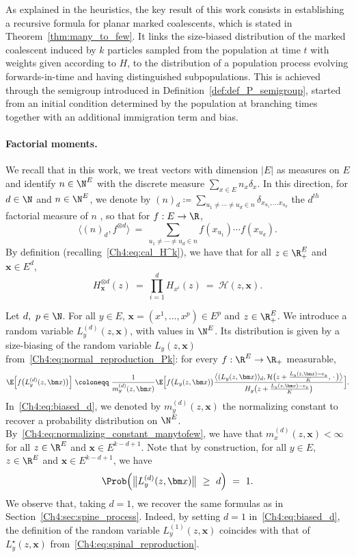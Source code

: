 \begin{refsegment}
As explained in the heuristics, the key result of this work consists in establishing a recursive formula for planar marked coalescents, which is stated in Theorem~\ref{thm:many_to_few}. It links the size-biased distribution of the marked coalescent induced by $k$ particles sampled from the population at time $t$ with weights given according to $H$, to the distribution of a population process evolving forwards-in-time and having distinguished subpopulations. 
This is achieved through the semigroup introduced in Definition~\ref{def:def_P_semigroup}, started from an initial condition determined by the population at branching times together with an additional immigration term and bias.
\paragraph{Factorial moments.}

We recall that in this work, we treat vectors  with dimension $|E|$ as measures on $E$ and identify $n\in \N^E$ with the discrete measure $\sum_{x\in E} n_x \delta_x$. In this direction, for $d\in \N$ and $n\in\N^E$, we denote by $(n)_d \coloneqq \sum_{u_1\neq \cdots \neq u_d \in n} \delta_{x_{u_1},\ldots x_{u_d}}$ the $d^{th}$ factorial measure of $n$ \cite[see][Chapter~1]{daley_vere-jones}, so that for $f:E\to\R$,
\[
\big\langle (n)_d,f^{\otimes d}\big\rangle \ =\ \sum_{u_1\neq \cdots \neq u_d \in n} f(x_{u_1})\cdots f(x_{u_d}).
\]
By definition (recalling~\eqref{Ch4:eq:cal_H^k}), we have that for all $z\in \R_+^E$ and $\bm x\in E^d$, 
\[
H_{\bm x}^{\otimes d}(z)\ =\ \prod_{i=1}^d H_{x^i}(z)\ =\ \mathcal{H}(z, \bm x).
\]


Let $d,\ p \in\N$. 
For all $y\in E$, $\bm x=(x^1, \ldots, x^{p})\in E^{p}$ and $z \in \R_+^E$. We introduce a random variable $L^{(d)}_{y}(z,\bm x)$, with values in $\N^E$. Its distribution is given by a size-biasing of the random variable $L_{y}(z,\bm x)$ from~\eqref{Ch4:eq:normal_reproduction_Pk}: for every $f:\R^E\to \R_+$ measurable,
\begin{equation}\label{Ch4:eq:biased_d}
\E\Big[f\big(L^{(d)}_{y}(z,\bm x)\big)\Big]\ \coloneqq\ \frac{1}{m^{(d)}_{y}(z,\bm x )}\E\Big[ f\big(L_{y}(z, \bm x)\big) \frac{ 
\big\langle (L_{y}(z, \bm x))_d,  \mathcal H\big(z+\frac{L_{y}(z,\bm x)- e_{y}}{K},\, \cdot\, \big)\big\rangle
}{ H_{y}\big(z+\frac{L_{y}(z,\bm x)- e_{y}}{K} \big)}\Big].
\end{equation}
In~\eqref{Ch4:eq:biased_d}, we denoted by $m_{y}^{(d)}(z, \bm x)$ the normalizing constant to recover a probability distribution on $\N^E$. By~\eqref{Ch4:eq:normalizing_constant_manytofew}, we have that $m_{x}^{(d)}(z, \bm x)<\infty$ for all $z\in \R^E$ and $\bm x\in E^{k-d+1}$.
Note that by construction, for all $y\in E$, $z\in \R^E$ and $\bm x\in E^{k-d+1}$, we have
\[
\Prob\Big(\big\lVert L^{(d)}_{y}(z,\bm x)\big\rVert\ \geq\ d \Big) \ =\ 1.
\]
  We observe that, taking $d=1$, we recover the same formulas as in Section~\ref{Ch4:sec:spine_process}. Indeed, by setting $d=1$ in~\eqref{Ch4:eq:biased_d}, the definition of the random variable $L^{(1)}_y(z,\bm x)$ coincides with that of $L^\star_y(z,\bm x)$ from~\eqref{Ch4:eq:spinal_reproduction}.


\end{refsegment}
